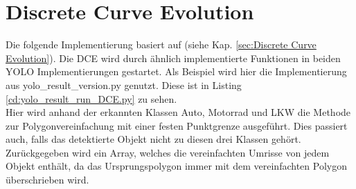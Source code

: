 \section{Discrete Curve Evolution}{
	\label{py:DCE}
	Die folgende Implementierung basiert auf \citeauthor{Barkowsky2000} \citep{Barkowsky2000} (siehe Kap. \ref{sec:Discrete Curve Evolution}). Die DCE wird durch ähnlich implementierte Funktionen in beiden YOLO Implementierungen gestartet. Als Beispiel wird hier die Implementierung aus yolo\_result\_version.py genutzt. Diese ist in Listing \ref{cd:yolo_result_run_DCE.py} zu sehen. \\
	Hier wird anhand der erkannten Klassen Auto, Motorrad und LKW die Methode zur Polygonvereinfachung mit einer festen Punktgrenze ausgeführt. Dies passiert auch, falls das detektierte Objekt nicht zu diesen drei Klassen gehört. \\ 
	
	Zurückgegeben wird ein Array, welches die vereinfachten Umrisse von jedem Objekt enthält, da das Ursprungspolygon immer mit dem vereinfachten Polygon überschrieben wird. \\

}
